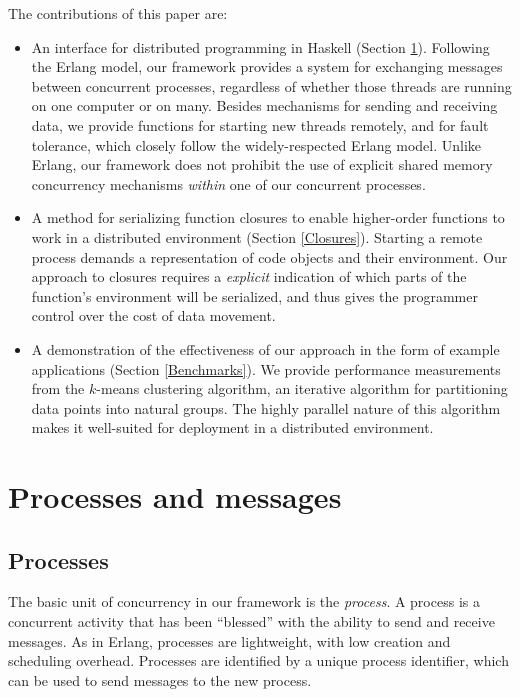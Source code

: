 \documentclass[preprint]{sigplanconf}
\begin{document}
The contributions of this paper are:
\begin{itemize}
\item An interface for distributed programming in Haskell (Section \ref{Processes}). Following the Erlang model, our framework provides a system for exchanging messages between concurrent processes, regardless of whether those threads are running on one computer or on many. Besides mechanisms for sending and receiving data, we provide functions for starting new threads remotely, and for fault tolerance, which closely follow the widely-respected Erlang model. Unlike Erlang, our framework does not prohibit the use of explicit shared memory concurrency mechanisms \emph{within} one of our concurrent processes.

\item A method for serializing function closures to enable higher-order functions to work in a distributed environment (Section \ref{Closures}). Starting a remote process demands a representation of code objects and their environment. Our approach to closures requires a \emph{explicit} indication of which parts of the function's environment will be serialized, and thus gives the programmer control over the cost of data movement.

\item A demonstration of the effectiveness of our approach in the form of example applications (Section \ref{Benchmarks}). We provide performance measurements from the $k$-means clustering algorithm, an iterative algorithm for partitioning data points into natural groups. The highly parallel nature of this algorithm makes it well-suited for deployment in a distributed environment.
\end{itemize}

\section{Processes and messages}
\label{Processes}
\subsection{Processes}
The basic unit of concurrency in our framework is the {\em process}. A process is a concurrent activity that has been ``blessed'' with the ability to send and receive messages. As in Erlang, processes are lightweight, with low creation and scheduling overhead.  Processes are identified by a unique process identifier, which can be used to send messages to the new process.
\end{document}
